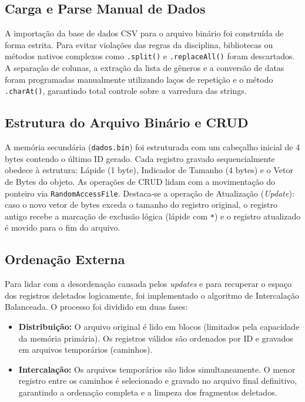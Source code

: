 \documentclass[12pt]{article}
\begin{document}
\subsection{Carga e Parse Manual de Dados}
A importação da base de dados CSV para o arquivo binário foi construída de forma estrita. Para evitar violações das regras da disciplina, bibliotecas ou métodos nativos complexos como \texttt{.split()} e \texttt{.replaceAll()} foram descartados. A separação de colunas, a extração da lista de gêneros e a conversão de datas foram programadas manualmente utilizando laços de repetição e o método \texttt{.charAt()}, garantindo total controle sobre a varredura das strings.

\subsection{Estrutura do Arquivo Binário e CRUD}
A memória secundária (\texttt{dados.bin}) foi estruturada com um cabeçalho inicial de 4 bytes contendo o último ID gerado. Cada registro gravado sequencialmente obedece à estrutura: Lápide (1 byte), Indicador de Tamanho (4 bytes) e o Vetor de Bytes do objeto. 
As operações de CRUD lidam com a movimentação do ponteiro via \texttt{RandomAccessFile}. Destaca-se a operação de Atualização (\textit{Update}): caso o novo vetor de bytes exceda o tamanho do registro original, o registro antigo recebe a marcação de exclusão lógica (lápide com \texttt{*}) e o registro atualizado é movido para o fim do arquivo.

\subsection{Ordenação Externa}
Para lidar com a desordenação causada pelos \textit{updates} e para recuperar o espaço dos registros deletados logicamente, foi implementado o algoritmo de Intercalação Balanceada. O processo foi dividido em duas fases:
\begin{itemize}
    \item \textbf{Distribuição:} O arquivo original é lido em blocos (limitados pela capacidade da memória primária). Os registros válidos são ordenados por ID e gravados em arquivos temporários (caminhos).
    \item \textbf{Intercalação:} Os arquivos temporários são lidos simultaneamente. O menor registro entre os caminhos é selecionado e gravado no arquivo final definitivo, garantindo a ordenação completa e a limpeza dos fragmentos deletados.
\end{itemize}
\end{document}
